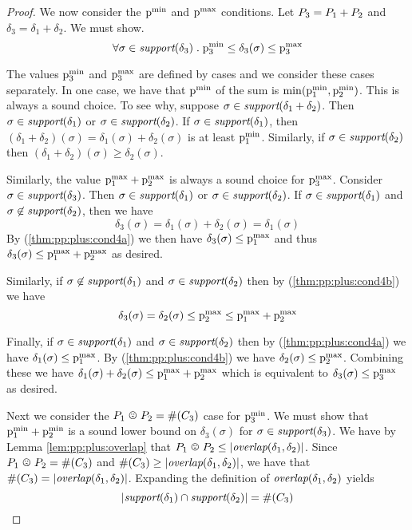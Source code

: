 \begin{proof}
We now consider the $\mathrm{p}^\mathrm{min}_{}$ and $\mathrm{p}^\mathrm{max}_{}$ conditions.  Let $P_{3} = P_{1} + P_{2}$ and $\delta_3 = \delta_1 + \delta_2$.  We must show.
\[\forall \sigma \in \textit{support}(\delta_3) \; . \; \mathrm{p}^\mathrm{min}_{3} \leq \delta_3(\sigma) \leq \mathrm{p}^\mathrm{max}_{3}\]

The values $\mathrm{p}^\mathrm{min}_{3}$ and $\mathrm{p}^\mathrm{max}_{3}$ are defined by cases and we
consider these cases separately.  In one case, we have that $\mathrm{p}^\mathrm{min}_{}$
of the sum is $\min(\mathrm{p}^\mathrm{min}_{1},\mathrm{p}^\mathrm{min}_{2})$.  This is always a sound
choice.  To see why, suppose $\sigma \in \textit{support}(\delta_1 + \delta_2)$.
Then $\sigma \in \textit{support}(\delta_1)$ or $\sigma \in \textit{support}(\delta_2)$.
If $\sigma \in \textit{support}(\delta_1)$, then $(\delta_1+\delta_2)(\sigma) =
\delta_1(\sigma) + \delta_2(\sigma)$ is at least $\mathrm{p}^\mathrm{min}_{1}$.
Similarly, if $\sigma \in \textit{support}(\delta_2)$ then
$(\delta_1+\delta_2)(\sigma) \geq \delta_2(\sigma)$.

Similarly, the value $\mathrm{p}^\mathrm{max}_{1}+ \mathrm{p}^\mathrm{max}_{2}$ is always a sound choice for
$\mathrm{p}^\mathrm{max}_{3}$.  Consider $\sigma \in \textit{support}(\delta_3)$.  Then $\sigma \in
\textit{support}(\delta_1)$ or $\sigma \in \textit{support}(\delta_2)$.  If $\sigma \in
\textit{support}(\delta_1)$ and $\sigma \not\in \textit{support}(\delta_2)$, then we have
\[\delta_3(\sigma) = \delta_1(\sigma) + \delta_2(\sigma) = \delta_1(\sigma)\]
By (\ref{thm:pp:plus:cond4a}) we then have $\delta_3(\sigma) \leq
\mathrm{p}^\mathrm{max}_{1}$ and thus $\delta_3(\sigma) \leq \mathrm{p}^\mathrm{max}_{1} + \mathrm{p}^\mathrm{max}_{2}$ as
desired.

Similarly, if $\sigma \not\in \textit{support}(\delta_1)$ and $\sigma \in
\textit{support}(\delta_2)$ then by (\ref{thm:pp:plus:cond4b}) we have
\[\delta_3(\sigma) = \delta_2(\sigma) \leq \mathrm{p}^\mathrm{max}_{2} \leq \mathrm{p}^\mathrm{max}_{1} + \mathrm{p}^\mathrm{max}_{2}\]

Finally, if $\sigma \in \textit{support}(\delta_1)$ and $\sigma \in
\textit{support}(\delta_2)$ then by (\ref{thm:pp:plus:cond4a}) we have
$\delta_1(\sigma) \leq \mathrm{p}^\mathrm{max}_{1}$.  By (\ref{thm:pp:plus:cond4b}) we
have $\delta_2(\sigma) \leq \mathrm{p}^\mathrm{max}_{2}$.  Combining these we have
$\delta_1(\sigma) + \delta_2(\sigma) \leq \mathrm{p}^\mathrm{max}_{1} + \mathrm{p}^\mathrm{max}_{2}$ which
is equivalent to $\delta_3(\sigma) \leq \mathrm{p}^\mathrm{max}_{3}$ as desired.

Next we consider the $\pessoverlap{\ppa}{\ppb} = \psize{\getpoly{3}}$
case for $\mathrm{p}^\mathrm{min}_{3}$.  We must show that $\mathrm{p}^\mathrm{min}_{1} + \mathrm{p}^\mathrm{min}_{2}$ is a
sound lower bound on $\delta_3(\sigma)$ for
$\sigma \in \textit{support}(\delta_3)$.  We have by
Lemma \ref{lem:pp:plus:overlap} that
$\pessoverlap{\ppa}{\ppb} \leq \setsize{\overlap{\delta_1}{\delta_2}}$.
Since $\pessoverlap{\ppa}{\ppb} = \psize{\getpoly{3}}$ and
$\#(C_{3}) \geq \left| \textit{overlap}(\delta_1,\delta_2) \right|$, we
have that $\#(C_{3})
= \left| \textit{overlap}(\delta_1,\delta_2) \right|$.  Expanding the definition
of $\textit{overlap}(\delta_1,\delta_2)$ yields
\begin{equation}
\label{thm:pp:plus:cap-eq}
\setsize{\nzset{\delta_1} \cap \nzset{\delta_2}} = \psize{\getpoly{3}}
\end{equation}


\end{proof}
